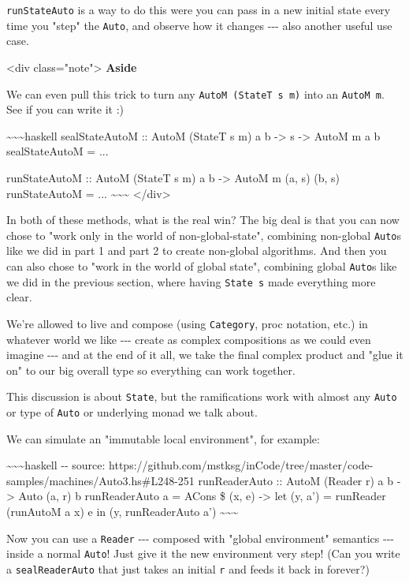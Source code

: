 \documentclass[]{article}
\begin{document}
\texttt{runStateAuto} is a way to do this were you can pass in a new initial
state every time you "step" the \texttt{Auto}, and observe how it changes
-\/-\/- also another useful use case.

\textless{}div class="note"\textgreater{} \textbf{Aside}

We can even pull this trick to turn any \texttt{AutoM\ (StateT\ s\ m)} into an
\texttt{AutoM\ m}. See if you can write it :)

\textasciitilde{}\textasciitilde{}\textasciitilde{}haskell sealStateAutoM ::
AutoM (StateT s m) a b -\textgreater{} s -\textgreater{} AutoM m a b
sealStateAutoM = ...

runStateAutoM :: AutoM (StateT s m) a b -\textgreater{} AutoM m (a, s) (b, s)
runStateAutoM = ... \textasciitilde{}\textasciitilde{}\textasciitilde{}
\textless{}/div\textgreater{}

In both of these methods, what is the real win? The big deal is that you can now
chose to "work only in the world of non-global-state", combining non-global
\texttt{Auto}s like we did in part 1 and part 2 to create non-global algorithms.
And then you can also chose to "work in the world of global state", combining
global \texttt{Auto}s like we did in the previous section, where having
\texttt{State\ s} made everything more clear.

We're allowed to live and compose (using \texttt{Category}, proc notation, etc.)
in whatever world we like -\/-\/- create as complex compositions as we could
even imagine -\/-\/- and at the end of it all, we take the final complex product
and "glue it on" to our big overall type so everything can work together.

This discussion is about \texttt{State}, but the ramifications work with almost
any \texttt{Auto} or type of \texttt{Auto} or underlying monad we talk about.

We can simulate an "immutable local environment", for example:

\textasciitilde{}\textasciitilde{}\textasciitilde{}haskell -\/- source:
https://github.com/mstksg/inCode/tree/master/code-samples/machines/Auto3.hs\#L248-251
runReaderAuto :: AutoM (Reader r) a b -\textgreater{} Auto (a, r) b
runReaderAuto a = ACons \$ (x, e) -\textgreater{} let (y, a') = runReader
(runAutoM a x) e in (y, runReaderAuto a')
\textasciitilde{}\textasciitilde{}\textasciitilde{}

Now you can use a \texttt{Reader} -\/-\/- composed with "global environment"
semantics -\/-\/- inside a normal \texttt{Auto}! Just give it the new
environment very step! (Can you write a \texttt{sealReaderAuto} that just takes
an initial \texttt{r} and feeds it back in forever?)
\end{document}
